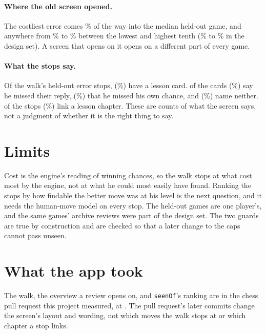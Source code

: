 \documentclass[11pt]{article}
\begin{document}
\paragraph{Where the old screen opened.} The costliest error comes \HeldSeenAt\% of the way into
the median held-out game, and anywhere from \HeldSeenAtLow\% to \HeldSeenAtHigh\% between the
lowest and highest tenth (\DesignSeenAtLow\% to \DesignSeenAtHigh\% in the design set). A screen
that opens on it opens on a different part of every game.

\paragraph{What the stops say.} Of the walk's \TeachStops{} held-out error stops, \TeachCards{}
(\TeachCardShare\%) have a lesson card. \TeachReply{} of the cards (\TeachReplyShare\%) say he
missed their reply, \TeachChance{} (\TeachChanceShare\%) that he missed his own chance, and
\TeachNeither{} (\TeachNeitherShare\%) name neither. \TeachLesson{} of the stops
(\TeachLessonShare\%) link a lesson chapter. These are counts of what the screen says, not a judgment of whether it is the right thing to say.

\section{Limits}

Cost is the engine's reading of winning chances, so the walk stops at what cost most by the
engine, not at what he could most easily have found. Ranking the stops by how findable the
better move was at his level is the next question, and it needs the human-move model on every
stop. The held-out games are one player's, and the same games' archive reviews were part of the
design set. The two guards are true by construction and are checked so that a later change to
the caps cannot pass unseen.

\section{What the app took}

The walk, the overview a review opens on, and \texttt{seenOf}'s ranking are in the chess pull
request this project measured, at \texttt{\AppCommit}. The pull request's later commits change
the screen's layout and wording, not which moves the walk stops at or which chapter a stop
links.
\end{document}
